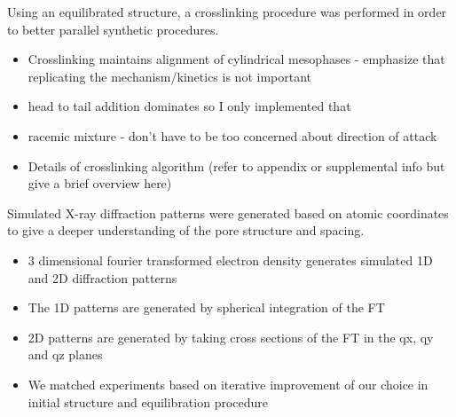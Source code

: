 Using an equilibrated structure, a crosslinking procedure was performed in order to better parallel synthetic procedures. 
\begin{itemize}
	\item Crosslinking maintains alignment of cylindrical mesophases - emphasize that replicating the mechanism/kinetics is not important 
	\item head to tail addition dominates so I only implemented that
	\item racemic mixture - don't have to be too concerned about direction of attack 
	\item Details of crosslinking algorithm (refer to appendix or supplemental info but give a brief overview here)
\end{itemize}  
	
Simulated X-ray diffraction patterns were generated based on atomic coordinates to give a deeper understanding of the pore structure and spacing. 
\begin{itemize}
	\item 3 dimensional fourier transformed electron density generates simulated 1D and 2D diffraction patterns
        \item The 1D patterns are generated by spherical integration of the FT
        \item 2D patterns are generated by taking cross sections of the FT in the qx, qy and qz planes
        \item We matched experiments based on iterative improvement of our choice in initial structure and equilibration procedure
\end{itemize}

